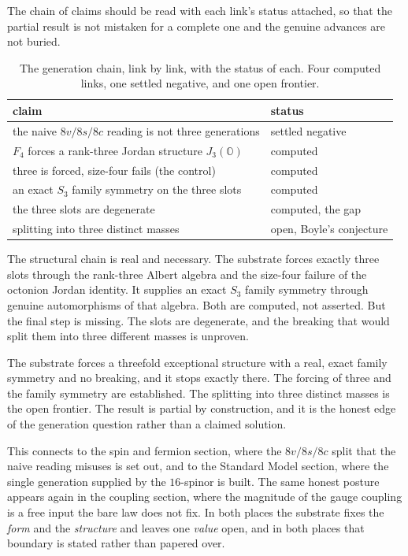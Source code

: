 The chain of claims should be read with each link's status attached, so that the partial result is not mistaken for a complete one and the genuine advances are not buried.

\begin{table}[ht]
\centering
\begin{tabular}{@{}ll@{}}
\toprule
claim & status \\
\midrule
the naive $8v/8s/8c$ reading is not three generations & settled negative \\
$F_4$ forces a rank-three Jordan structure $J_3(\mathbb{O})$ & computed \\
three is forced, size-four fails (the control) & computed \\
an exact $S_3$ family symmetry on the three slots & computed \\
the three slots are degenerate & computed, the gap \\
splitting into three distinct masses & open, Boyle's conjecture \\
\bottomrule
\end{tabular}
\caption{The generation chain, link by link, with the status of each. Four computed links, one settled negative, and one open frontier.}
\label{tab:gen-status}
\end{table}

The structural chain is real and necessary. The substrate forces exactly three slots through the rank-three Albert algebra and the size-four failure of the octonion Jordan identity. It supplies an exact $S_3$ family symmetry through genuine automorphisms of that algebra. Both are computed, not asserted. But the final step is missing. The slots are degenerate, and the breaking that would split them into three different masses is unproven.

\begin{result}
The substrate forces a threefold exceptional structure with a real, exact family symmetry and no breaking, and it stops exactly there. The forcing of three and the family symmetry are established. The splitting into three distinct masses is the open frontier. The result is partial by construction, and it is the honest edge of the generation question rather than a claimed solution.
\end{result}

This connects to the spin and fermion section, where the $8v / 8s / 8c$ split that the naive reading misuses is set out, and to the Standard Model section, where the single generation supplied by the $16$-spinor is built. The same honest posture appears again in the coupling section, where the magnitude of the gauge coupling is a free input the bare law does not fix. In both places the substrate fixes the \emph{form} and the \emph{structure} and leaves one \emph{value} open, and in both places that boundary is stated rather than papered over.
